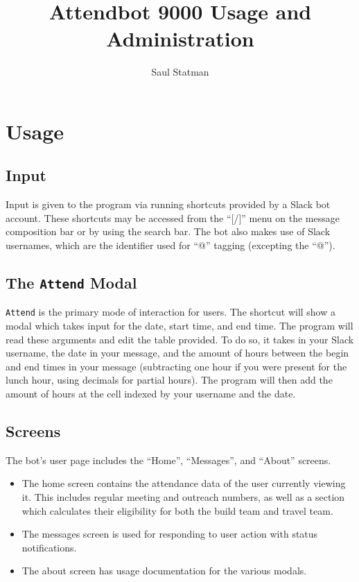 \documentclass[english]{article}
\begin{document}
\title{Attendbot 9000 Usage and Administration}
\author{Saul Statman}
\maketitle

\section{Usage}

\subsection{Input}

Input is given to the program via running shortcuts provided by a
Slack bot account. These shortcuts may be accessed from the ``{[}/{]}''
menu on the message composition bar or by using the search bar. The
bot also makes use of Slack usernames, which are the identifier used
for ``@'' tagging (excepting the ``@'').

\subsection{The \texttt{Attend} Modal}

\texttt{Attend} is the primary mode of interaction for users. The
shortcut will show a modal which takes input for the date, start time,
and end time. The program will read these arguments and edit the table
provided. To do so, it takes in your Slack username, the date in your
message, and the amount of hours between the begin and end times in
your message (subtracting one hour if you were present for the lunch
hour, using decimals for partial hours). The program will then add
the amount of hours at the cell indexed by your username and the date.

\subsection{Screens}

The bot's user page includes the ``Home'', ``Messages'', and ``About''
screens.
\begin{itemize}
\item The home screen contains the attendance data of the user currently
viewing it. This includes regular meeting and outreach numbers, as
well as a section which calculates their eligibility for both the
build team and travel team.
\item The messages screen is used for responding to user action with status
notifications.
\item The about screen has usage documentation for the various modals.
\end{itemize}
\end{document}
